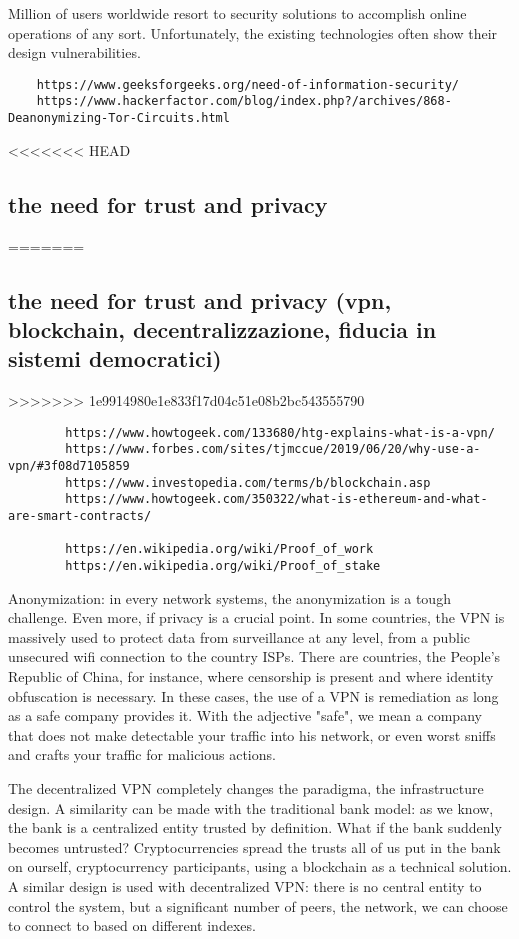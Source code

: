 \documentclass[]{article}
\begin{document}
	Million of users worldwide resort to security solutions to accomplish online operations of any sort. Unfortunately, the existing technologies often show their design vulnerabilities.

	\begin{verbatim}
	https://www.geeksforgeeks.org/need-of-information-security/
	https://www.hackerfactor.com/blog/index.php?/archives/868-Deanonymizing-Tor-Circuits.html
	\end{verbatim}
	
<<<<<<< HEAD
	\subsection{the need for trust and privacy}
=======
	\subsection{the need for trust and privacy (vpn, blockchain, decentralizzazione, fiducia in sistemi democratici)}
>>>>>>> 1e9914980e1e833f17d04c51e08b2bc543555790
	\begin{verbatim}
		https://www.howtogeek.com/133680/htg-explains-what-is-a-vpn/
		https://www.forbes.com/sites/tjmccue/2019/06/20/why-use-a-vpn/#3f08d7105859
		https://www.investopedia.com/terms/b/blockchain.asp
		https://www.howtogeek.com/350322/what-is-ethereum-and-what-are-smart-contracts/
		
		https://en.wikipedia.org/wiki/Proof_of_work
		https://en.wikipedia.org/wiki/Proof_of_stake
	\end{verbatim}
	
	Anonymization: in every network systems, the anonymization is a tough challenge. Even more, if privacy is a crucial point. In some countries, the VPN is massively used to protect data from surveillance at any level, from a public unsecured wifi connection to the country ISPs. There are countries, the People's Republic of China, for instance, where censorship is present and where identity obfuscation is necessary. In these cases, the use of a VPN is remediation as long as a safe company provides it. With the adjective "safe", we mean a company that does not make detectable your traffic into his network, or even worst sniffs and crafts your traffic for malicious actions. 

	The decentralized VPN completely changes the paradigma, the infrastructure design.
	A similarity can be made with the traditional bank model: as we know, the bank is a centralized entity trusted by definition. What if the bank suddenly becomes untrusted? Cryptocurrencies spread the trusts all of us put in the bank on ourself, cryptocurrency participants, using a blockchain as a technical solution. 
	A similar design is used with decentralized VPN: there is no central entity to control the system, but a significant number of peers, the network, we can choose to connect to based on different indexes.
\end{document}
